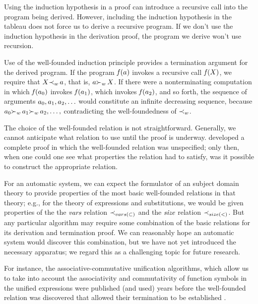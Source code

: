 \documentclass[runningheads]{llncs}
\DeclareMathOperator{\uf}{\emph{f}\,}
\begin{document}
Using the induction hypothesis in a proof can introduce a recursive call into the program being derived.  However,  including the induction hypothesis in the tableau does not force us to derive a recursive program. If we don't use the induction hypothesis in the derivation proof, the program we derive won't use recursion.
 

Use of the well-founded induction principle provides a termination argument for the derived program.  If the program $\uf(a)$ invokes a recursive call $\uf(\var{X})$, we require that $ X {\prec}_{ w} \, a $, that is,  $ a {\succ}_{w} \, X$. If there were a nonterminating computation in which $\uf(\expsub{a}{0})$ invokes $\uf(\expsub{a}{1})$, which invokes $\uf(\expsub{a}{2})$, and so forth, the sequence of arguments ${a}_{0}, {a}_{1}, {a}_{2}, \ldots  $ would constitute an infinite decreasing sequence, because ${a}_{0} {\succ}_{w}\, {a}_{1} {\succ}_{w} \, {a}_{2}, \ldots ,$ contradicting the well-foundedness of ${\prec}_{w}$.


The choice of the well-founded relation is not straightforward.  Generally, we cannot anticipate what relation to use until the proof is underway. \citet{man:wal} developed a complete proof in which the well-founded relation was unspecified; only then, when one could one see what properties the relation had to satisfy, was it possible to construct the appropriate relation.  

For an automatic system, we can expect the formulator of an subject domain theory to provide properties of the most basic well-founded relations in that theory; e.g., for the theory of expressions and substitutions, we would be given  properties of the the $\emph{vars}$  relation ${\prec}_{vars(\subset)}$  and the $\emph{size}$ relation ${\prec}_{size(<)}$.  But any particular algorithm may require some combination of the basic relations for its derivation and termination proof. We can reasonably hope  an automatic system would discover this combination, but we have not yet introduced the necessary apparatus; we regard this as a challenging topic for future research.   

For instance, the associative-commutative unification algorithms,  which allow us to take into account the associativity and commutativity of function symbols in the unified expressions \citep{sti:acu,  liv-siek:acu} were published (and used) years before the well-founded relation was discovered that allowed their termination to be established   \citep{fag:acu}.
\end{document}
